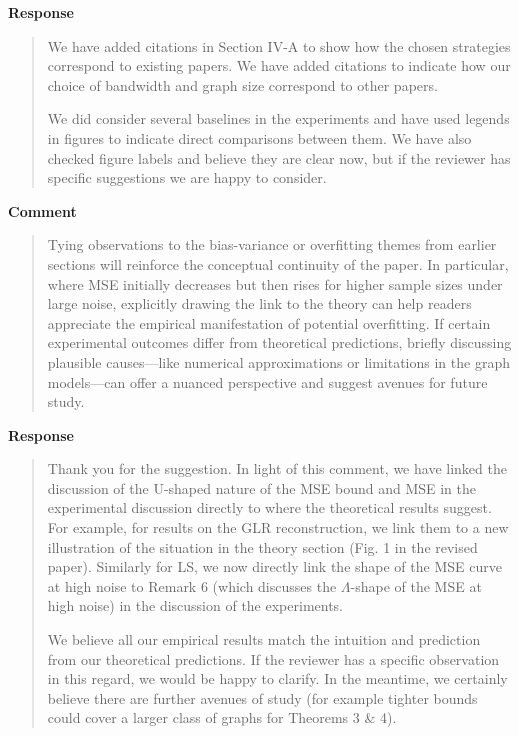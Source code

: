 \documentclass[11pt,onecolumn,journal]{IEEEtran}
\theoremstyle{definition}
\begin{document}
\textbf{Response}
\begin{quote}
We have added citations in Section IV-A to show how the chosen strategies correspond to existing papers. We have added citations to indicate how our choice of bandwidth and graph size correspond to other papers.

We did consider several baselines in the experiments and have used legends in figures to indicate direct comparisons between them. We have also checked figure labels and believe they are clear now, but if the reviewer has specific suggestions we are happy to consider.

\end{quote}

\textbf{Comment}
\begin{quote}
Tying observations to the bias-variance or overfitting themes from earlier sections will reinforce the conceptual continuity of the paper. In particular, where MSE initially decreases but then rises for higher sample sizes under large noise, explicitly drawing the link to the theory can help readers appreciate the empirical manifestation of potential overfitting. If certain experimental outcomes differ from theoretical predictions, briefly discussing plausible causes—like numerical approximations or limitations in the graph models—can offer a nuanced perspective and suggest avenues for future study.
\end{quote}

\textbf{Response}
\begin{quote}
Thank you for the suggestion. 
In light of this comment, we have linked the discussion of the U-shaped nature of the MSE bound and MSE in the experimental discussion directly to where the theoretical results suggest. For example, for results on the GLR reconstruction, we link them to a new illustration of the situation in the theory section (Fig. 1 in the revised paper). 
Similarly for LS, we now directly link the shape of the MSE curve at high noise to Remark 6 (which discusses the $\Lambda$-shape of the MSE at high noise) in the discussion of the experiments.

We believe all our empirical results match the intuition and prediction from our theoretical predictions. If the reviewer has a specific observation in this regard, we would be happy to clarify. In the meantime, we certainly believe there are further avenues of study (for example tighter bounds could cover a larger class of graphs for Theorems 3 \& 4). 
\end{quote}
\end{document}
